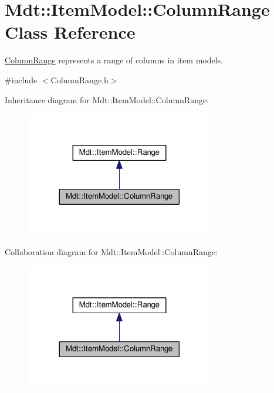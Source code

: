 \hypertarget{class_mdt_1_1_item_model_1_1_column_range}{}\section{Mdt\+:\+:Item\+Model\+:\+:Column\+Range Class Reference}
\label{class_mdt_1_1_item_model_1_1_column_range}


\hyperlink{class_mdt_1_1_item_model_1_1_column_range}{Column\+Range} represents a range of columns in item models.  




{\ttfamily \#include $<$Column\+Range.\+h$>$}



Inheritance diagram for Mdt\+:\+:Item\+Model\+:\+:Column\+Range\+:
\nopagebreak
\begin{figure}[H]
\begin{center}
\leavevmode
\includegraphics[width=233pt]{class_mdt_1_1_item_model_1_1_column_range__inherit__graph}
\end{center}
\end{figure}


Collaboration diagram for Mdt\+:\+:Item\+Model\+:\+:Column\+Range\+:
\nopagebreak
\begin{figure}[H]
\begin{center}
\leavevmode
\includegraphics[width=233pt]{class_mdt_1_1_item_model_1_1_column_range__coll__graph}
\end{center}
\end{figure}
